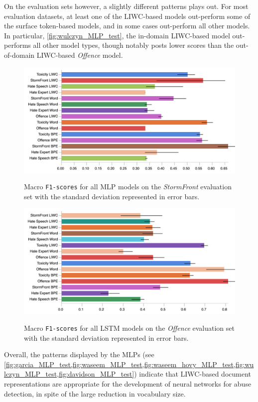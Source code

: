 On the evaluation sets however, a slightly different patterns plays out. 
For most evaluation datasets, at least one of the LIWC-based models out-perform some of the surface token-based models, and in some cases out-perform all other models.
In particular, \cref{fig:wulczyn_MLP_test}, the in-domain LIWC-based model out-performs all other model types, though notably posts lower scores than the out-of-domain LIWC-based \textit{Offence} model.

\begin{figure}
\begin{minipage}{\textwidth}
\centering
  \includegraphics[width=\textwidth]{all_MLP_garcia_test.pdf}
  \caption{Macro \texttt{F1-scores} for all MLP models on the \textit{StormFront} evaluation set with the standard deviation represented in error bars.}
  \label{fig:garcia_MLP_test}
  \vfill
    \includegraphics[width=\textwidth]{all_LSTM_davidson_test.pdf}
    \caption{Macro \texttt{F1-scores} for all LSTM models on the \textit{Offence} evaluation set with the standard deviation represented in error bars.}
    \label{fig:davidson_LSTM_test}
  \end{minipage}
\end{figure}

Overall, the patterns displayed by the MLPs (see \cref{fig:garcia_MLP_test,fig:waseem_MLP_test,fig:waseem_hovy_MLP_test,fig:wulczyn_MLP_test,fig:davidson_MLP_test}) indicate that LIWC-based document representations are appropriate for the development of neural networks for abuse detection, in spite of the large reduction in vocabulary size.

